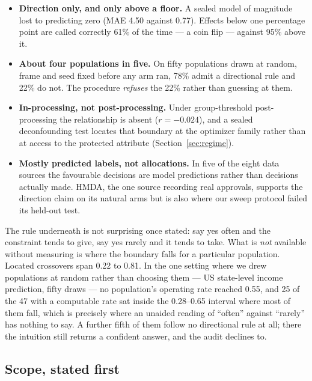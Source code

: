 \documentclass[9pt,conference]{IEEEtran}
\begin{document}
\begin{itemize}
\item \textbf{Direction only, and only above a floor.} A sealed model of magnitude lost to
predicting zero (MAE 4.50 against 0.77). Effects below one percentage point are called
correctly 61\% of the time --- a coin flip --- against 95\% above it.
\item \textbf{About four populations in five.} On fifty populations drawn at random, frame
and seed fixed before any arm ran, 78\% admit a directional rule and 22\% do not. The
procedure \emph{refuses} the 22\% rather than guessing at them.
\item \textbf{In-processing, not post-processing.} Under group-threshold post-processing
\cite{hardt2016} the relationship is absent ($r = -0.024$), and a sealed deconfounding test
locates that boundary at the optimizer family rather than at access to the protected
attribute
(Section~\ref{sec:regime}).
\item \textbf{Mostly predicted labels, not allocations.} In five of the eight data sources
the favourable decisions are model predictions rather than decisions actually made. HMDA,
the one source recording real approvals, supports the direction claim on its natural arms
but is also where our sweep protocol failed its held-out test.
\end{itemize}

The rule underneath is not surprising once stated: say yes often and the constraint tends to
give, say yes rarely and it tends to take. What is \emph{not} available without measuring is
where the boundary falls for a particular population. Located crossovers span 0.22 to 0.81. In the one setting where we drew populations at random rather than choosing them --- US
state-level income prediction, fifty draws --- no population's operating rate reached 0.55,
and 25 of the 47 with a computable rate sat inside the 0.28--0.65 interval where most of them fall, which is precisely
where an unaided reading of ``often'' against ``rarely'' has nothing to say. A further fifth
of them follow no directional rule at all; there the intuition still returns a confident
answer, and the audit declines to.

\subsection{Scope, stated first}
\label{sec:scope}
\end{document}
